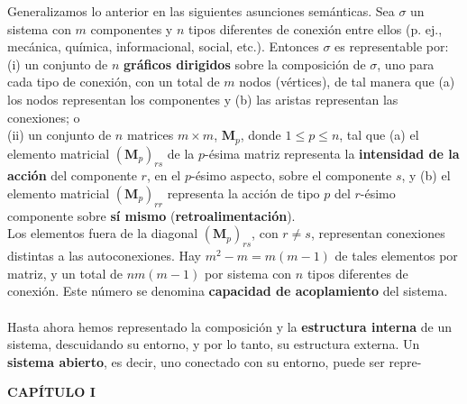 {Generalizamos lo anterior en las siguientes asunciones semánticas. Sea $\sigma$ un sistema con $m$ componentes y $n$ tipos diferentes de conexión entre ellos (p. ej., mecánica, química, informacional, social, etc.). Entonces $\sigma$ es representable por:\\

(i) un conjunto de $n$ \textbf{gráficos dirigidos} sobre la composición de $\sigma$, uno para cada tipo de conexión, con un total de $m$ nodos (vértices), de tal manera que (a) los nodos representan los componentes y (b) las aristas representan las conexiones; o
\\ (ii) un conjunto de $n$ matrices $m \times m$, $\mathbf{M}_p$, donde $1 \le p \le n$, tal que (a) el elemento matricial $(\mathbf{M}_p)_{rs}$ de la $p$-ésima matriz representa la \textbf{intensidad de la acción} del componente $r$, en el $p$-ésimo aspecto, sobre el componente $s$, y (b) el elemento matricial $(\mathbf{M}_p)_{rr}$ representa la acción de tipo $p$ del $r$-ésimo componente sobre \textbf{sí mismo} (\textbf{retroalimentación}).
\\

Los elementos fuera de la diagonal $(\mathbf{M}_p)_{rs}$, con $r \ne s$, representan conexiones distintas a las autoconexiones. Hay $m^2 - m = m(m - 1)$ de tales elementos por matriz, y un total de $nm(m - 1)$ por sistema con $n$ tipos diferentes de conexión. Este número se denomina \textbf{capacidad de acoplamiento} del sistema.
\\
\\
Hasta ahora hemos representado la composición y la \textbf{estructura interna} de un sistema, descuidando su entorno, y por lo tanto, su estructura externa. Un \textbf{sistema abierto}, es decir, uno conectado con su entorno, puede ser repre-
}

\newpage
\fancyhf{}
\fancyhead[l]{\thepage} 
\begin{center}
{\fontsize{13}{16}\selectfont \textbf{CAPÍTULO I}}
\end{center}
\vspace{0.5cm}

